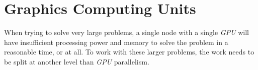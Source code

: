 \chapter{Graphics Computing Units} \label{chapter:graphics_computing_units} 

When trying to solve very large problems, a single node with a single \textit{GPU} will have
insufficient processing power and memory to solve the problem in a reasonable time, or at all. To
work with these larger problems, the work needs to be split at another level than \textit{GPU}
parallelism. 
